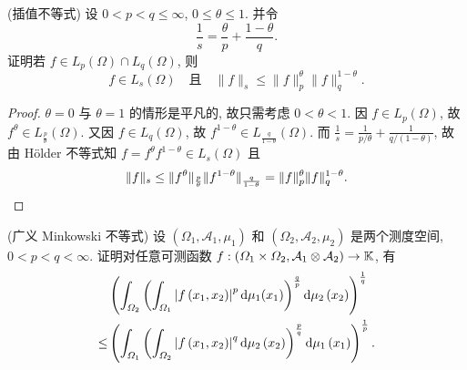 \begin{exercise}(插值不等式)
    设 $0<p<q\leq\infty$, $0\leq\theta\leq 1$. 并令
    \[\frac{1}{s}=\frac{\theta}{p}+\frac{1-\theta}{q}.\]
    证明若 $f\in L_p(\varOmega)\cap L_q(\varOmega)$, 则
    \[f\in L_s(\varOmega)\quad\text{且}\quad \|f\|_s\leq\|f\|_p^{\theta}\|f\|_q^{1-\theta}.\]
\end{exercise}

\begin{proof}
    $\theta=0$ 与 $\theta=1$ 的情形是平凡的, 故只需考虑 $0<\theta<1$.
    因 $f\in L_p(\varOmega)$, 故 $f^{\theta}\in L_{\frac{p}{\theta}}(\varOmega)$.
    又因 $f\in L_q(\varOmega)$, 故 $f^{1-\theta}\in L_{\frac{q}{1-\theta}}(\varOmega)$.
    而 $\frac{1}{s}=\frac{1}{p/\theta}+\frac{1}{q/(1-\theta)}$, 故由 H\"older 不等式知
    $f=f^{\theta}f^{1-\theta}\in L_s(\varOmega)$ 且
    \[\|f\|_s\leq\|f^{\theta}\|_{\frac{p}{\theta}} \|f^{1-\theta}\|_{\frac{q}{1-\theta}}=\|f\|_p^{\theta} \|f\|_q^{1-\theta}.\qedhere\]
\end{proof}




\begin{exercise}(广义 Minkowski 不等式) 
    设 $\left(\varOmega_{1}, \mathcal{A}_{1}, \mu_{1}\right)$ 
    和 $\left(\varOmega_{2}, \mathcal{A}_{2}, \mu_{2}\right)$ 是两个测度空间, $0<p<q<\infty$. 
    证明对任意可测函数 
    $f:\left(\varOmega_{1} \times \varOmega_{2}, \mathcal{A}_{1} \otimes \mathcal{A}_{2}\right) \rightarrow\mathbb{K}$, 有
    \begin{align*}
        &\left(\int_{\varOmega_{2}}\left(\int_{\varOmega_{1}}\left|f\left(x_{1}, x_{2}\right)\right|^{p}\mathop{}\!\mathrm{d}\mu_{1}(x_{1})\right)^{\frac{q}{p}}\mathop{}\!\mathrm{d} \mu_{2}\left(x_{2}\right)\right)^{\frac{1}{q}} \\
   \leq &\left(\int_{\varOmega_{1}}\left(\int_{\varOmega_{2}}\left|f\left(x_{1}, x_{2}\right)\right|^{q}\mathop{}\!\mathrm{d}\mu_{2}\left(x_{2}\right)\right)^{\frac{p}{q}}\mathop{}\!\mathrm{d}\mu_{1}\left(x_{1}\right)\right)^{\frac{1}{p}}.
    \end{align*}
\end{exercise}

